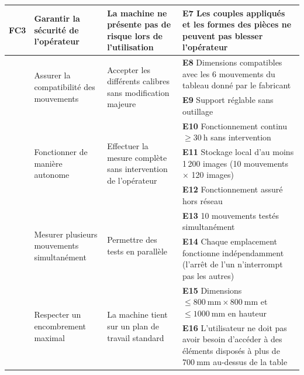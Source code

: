 \begin{landscape}
\begin{longtable}{|>{\raggedright\arraybackslash}p{1cm}|p{4.5cm}|p{5.5cm}|p{10.5cm}|}
FC3 & Garantir la sécurité de l'opérateur & La machine ne présente pas de risque lors de l'utilisation
    & \rule[-0.4\baselineskip]{0pt}{1.8\baselineskip}\textbf{E7} Les couples appliqués et les formes des pièces ne peuvent pas blesser l'opérateur \\
\hline

\multirow{2}{*}{FC4} & \multirow{2}{4.5cm}{Assurer la compatibilité des mouvements} & \multirow{2}{5.5cm}{Accepter les différents calibres sans modification majeure}
    & \rule[-0.4\baselineskip]{0pt}{1.8\baselineskip}\textbf{E8} Dimensions compatibles avec les 6 mouvements du tableau donné par le fabricant \\
\cline{4-4}
 & & & \rule[-0.4\baselineskip]{0pt}{1.8\baselineskip}\textbf{E9} Support réglable sans outillage \\
\hline

\multirow{3}{*}{FC5} & \multirow{3}{4.5cm}{Fonctionner de manière autonome} & \multirow{3}{5.5cm}{Effectuer la mesure complète sans intervention de l'opérateur}
    & \rule[-0.4\baselineskip]{0pt}{1.8\baselineskip}\textbf{E10} Fonctionnement continu $\geq 30\ \mathrm{h}$ sans intervention \\
\cline{4-4}
 & & & \rule[-0.4\baselineskip]{0pt}{1.8\baselineskip}\textbf{E11} Stockage local d'au moins 1\,200 images (10 mouvements $\times$ 120 images) \\
\cline{4-4}
 & & & \rule[-0.4\baselineskip]{0pt}{1.8\baselineskip}\textbf{E12} Fonctionnement assuré hors réseau \\
\hline

\multirow{2}{*}{FC6} & \multirow{2}{4.5cm}{Mesurer plusieurs mouvements simultanément} & \multirow{2}{5.5cm}{Permettre des tests en parallèle}
    & \rule[-0.4\baselineskip]{0pt}{1.8\baselineskip}\textbf{E13} 10 mouvements testés simultanément \\
\cline{4-4}
 & & & \rule[-0.4\baselineskip]{0pt}{1.8\baselineskip}\textbf{E14} Chaque emplacement fonctionne indépendamment (l'arrêt de l'un n'interrompt pas les autres) \\
\hline

\multirow{2}{*}{FC7} & \multirow{2}{4.5cm}{Respecter un encombrement maximal} & \multirow{2}{5.5cm}{La machine tient sur un plan de travail standard}
    & \rule[-0.4\baselineskip]{0pt}{1.8\baselineskip}\textbf{E15} Dimensions $\leq 800\ \mathrm{mm} \times 800\ \mathrm{mm}$ et $\leq 1000\ \mathrm{mm}$ en hauteur \\
\cline{4-4}
 & & & \rule[-0.4\baselineskip]{0pt}{1.8\baselineskip}\textbf{E16} L'utilisateur ne doit pas avoir besoin d'accéder à des éléments disposés à plus de $700\ \mathrm{mm}$ au-dessus de la table \\
\hline


\end{longtable}
\end{landscape}
